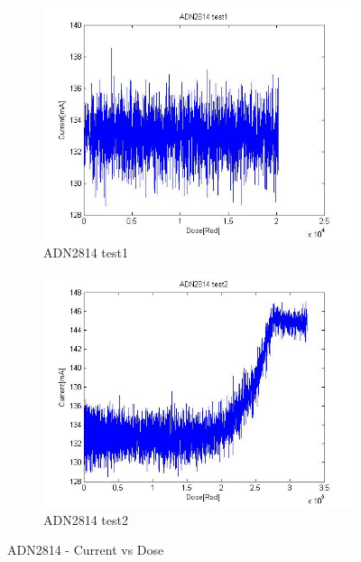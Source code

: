 \documentclass[12pt]{article}
\numberwithin{figure}{section}
\begin{document}
\begin{figure}[!htbp]
\centering
  \begin{subfigure}{.49\textwidth}
  \centering
  \includegraphics[width=\linewidth]{current_dose_ADN_t1.jpg}
  \caption{ADN2814 test1}
  \label{ADN2814_1}
  \end{subfigure}
  \begin{subfigure}{.49\textwidth}
  \centering
  \includegraphics[width=\linewidth]{current_dose_ADN_t2.jpg}
  \caption{ADN2814 test2}
  \label{ADN2814_2}
  \end{subfigure}
 \caption{ADN2814 - Current vs Dose}
\end{figure}
\end{document}
